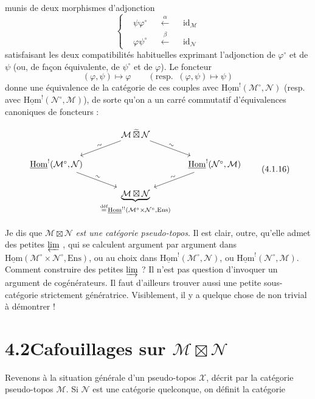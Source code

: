 \documentclass[11pt]{article}
\newcommand{\printedpage}[1]{\if\relax\detokenize{#1}\relax\else\marginpar{\footnotesize p.~#1}\fi}
\newcommand{\msp}[1]{\marginpar{\footnotesize [#1]}}
\newcommand{\uHom}{\underline{\mathrm{Hom}}}
\newcommand{\Ens}{\mathrm{Ens}}
\newcommand{\cM}{\mathcal{M}}
\newcommand{\cN}{\mathcal{N}}
\newcommand{\cX}{\mathcal{X}}
\newcommand{\defeq}{\overset{\text{déf}}{=}}
\newcommand{\bt}{\boxtimes}
\newcommand{\tbt}{\mathbin{\widetilde{\boxtimes}}}
\begin{document}
munis de deux morphismes d'adjonction
\[
\left\{
\begin{aligned}
&\psi\varphi^\circ &&\xleftarrow{\alpha} &&\mathrm{id}_{\mathcal{M}}\\
&\varphi\psi^\circ &&\xleftarrow{\beta} &&\mathrm{id}_{\mathcal{N}}
\end{aligned}
\right.
\tag*{(4.1.15)}
\]
satisfaisant les deux compatibilités habituelles exprimant l'adjonction de $\varphi^\circ$ et de $\psi$ (ou, de façon équivalente, de $\psi^\circ$ et de $\varphi$). Le foncteur
\[
(\varphi,\psi) \longmapsto \varphi \qquad (\text{resp.}\;\; (\varphi,\psi) \longmapsto \psi)
\]
donne une équivalence de la catégorie de ces couples avec $\uHom^!(\mathcal{M}^\circ,\mathcal{N})$ (resp. avec $\uHom^!(\mathcal{N}^\circ,\mathcal{M})$), de sorte qu'on a un carré commutatif d'équivalences canoniques de foncteurs :

\printedpage{4}

\msp{page 57}

\[
\begin{tikzcd}[column sep=small]
 & \cM \tbt \cN \arrow[dl, "\sim" sloped] \arrow[dr, "\sim" sloped] & \\
\uHom^{!}(\cM^{\circ},\cN) \arrow[dr, "\sim" sloped] & & \uHom^{!}(\cN^{\circ},\cM) \arrow[dl, "\sim" sloped] \\
 & \underbrace{\cM \bt \cN}_{\defeq \uHom^{!!}(\cM^{\circ}\times\cN^{\circ},\Ens)} &
\end{tikzcd}
\tag*{(4.1.16)}
\]



Je dis que $\cM \bt \cN$ \textit{est une catégorie pseudo-topos}. Il est clair, outre, qu'elle admet des petites $\varprojlim$ , qui se calculent argument par argument dans $\uHom(\cM^{\circ}\times\cN^{\circ},\Ens)$, ou au choix dans $\uHom^{!}(\cM^{\circ},\cN)$, ou $\uHom^{!}(\cN^{\circ},\cM)$. Comment construire des petites $\varinjlim$ ? Il n'est pas question d'invoquer un argument de cogénérateurs. Il faut d'ailleurs trouver aussi une petite sous-catégorie strictement génératrice. Visiblement, il y a quelque chose de non trivial à démontrer !

\section*{4.2\quad Cafouillages sur $\cM \bt \cN$}

Revenons à la situation générale d'un pseudo-topos $\cX$, décrit par la catégorie pseudo-topos $\cM$. Si $\cN$ est une catégorie quelconque, on définit la catégorie
\end{document}
